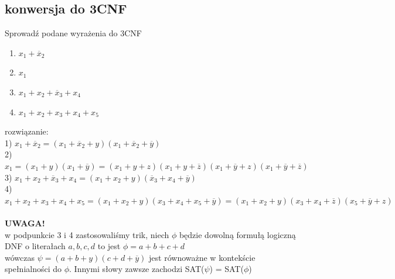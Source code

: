 \documentclass{article}
\begin{document}
\subsection*{konwersja do 3CNF}
Sprowadź podane wyrażenia do 3CNF 
\begin{enumerate}
	\item $x_1 + \overline{x}_2$
	\item $x_1$
	\item $x_1 + x_2 + \overline{x}_3 + x_4$
	\item $x_1 + x_2 + x_3 + x_4 + x_5$

\end{enumerate}
rozwiązanie: \\
1) $x_1 + \overline{x}_2 =(x_1 + \overline{x}_2 + y)(x_1 + \overline{x}_2 + \overline{y})$\\
2) $x_1 = (x_1 + y)(x_1 + \overline{y}) = (x_1 + y + z)(x_1 + y + \overline{z})(x_1 + \overline{y} + z)(x_1 + \overline{y} + \overline{z})$ \\
3) $x_1 + x_2 + \overline{x}_3 + x_4 = (x_1 + x_2 + y)(\overline{x}_3+x_4 + \overline{y})$ \\
4) $x_1 + x_2 + x_3 + x_4 + x_5 = (x_1 + x_2 + y)(x_3+x_4 + x_5 + \overline{y}) = (x_1+x_2+y)(x_3+x_4+\overline{z})(x_5+\overline{y}+z)$
\\\\
\textbf{UWAGA!} \\
w podpunkcie 3 i 4 zastosowaliśmy trik, niech $\phi$ będzie dowolną formułą logiczną DNF o literałach $a, b,c,d$  to jest $\phi = a+b+c+d$ \\
wówczas $\psi = (a+b+y)(c+d+\overline{y})$ jest równoważne w kontekście spełnialności do $\phi$. Innymi słowy zawsze zachodzi SAT($\psi$) = SAT($\phi$)
\end{document}
